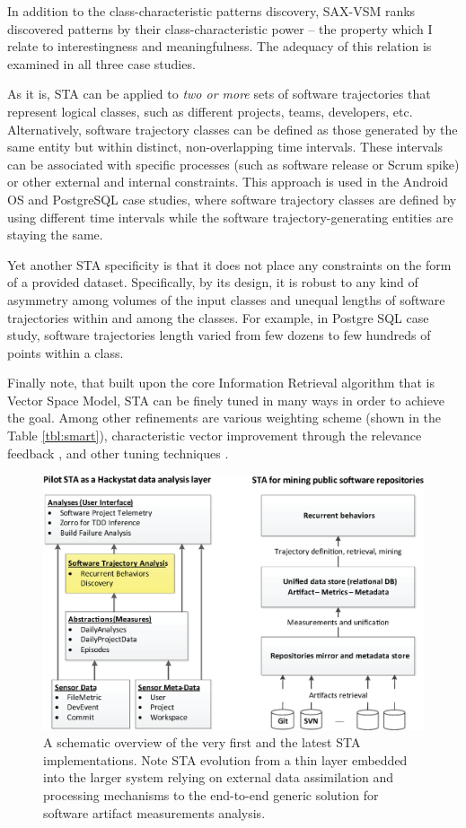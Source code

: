 In addition to the class-characteristic patterns discovery, SAX-VSM ranks discovered patterns by their class-characteristic power -- the property which I relate to interestingness and meaningfulness. The adequacy of this relation is examined in all three case studies.

As it is, STA can be applied to \textit{two or more} sets of software trajectories that represent logical classes, such as different projects, teams, developers, etc. Alternatively, software trajectory classes can be defined as those generated by the same entity but within distinct, non-overlapping time intervals. These intervals can be associated with specific processes (such as software release or Scrum spike) or other external and internal constraints. This approach is used in the Android OS and PostgreSQL case studies, where software trajectory classes are defined by using different time intervals while the software trajectory-generating entities are staying the same.

Yet another STA specificity is that it does not place any constraints on the form of a provided dataset. Specifically, by its design, it is robust to any kind of asymmetry among volumes of the input classes and unequal lengths of software trajectories within and among the classes. For example, in Postgre SQL case study, software trajectories length varied from few dozens to few hundreds of points within a class.

Finally note, that built upon the core Information Retrieval algorithm that is Vector Space Model, STA can be finely tuned in many ways in order to achieve the goal. Among other refinements are various weighting scheme (shown in the Table \ref{tbl:smart}), characteristic vector improvement through the relevance feedback \cite{salton-71}, and other tuning techniques \cite{intro_ir_Manning}.

\begin{figure}[t]
   \centering
   \includegraphics[width=145mm]{figures/STA12-schema-draft.eps}
   \caption{A schematic overview of the very first and the latest STA implementations. 
   Note STA evolution from a thin layer embedded into the larger system relying on external data assimilation and processing 
   mechanisms to the end-to-end generic solution for software artifact measurements analysis.}
   \label{fig:STA12-schema}
\end{figure}

